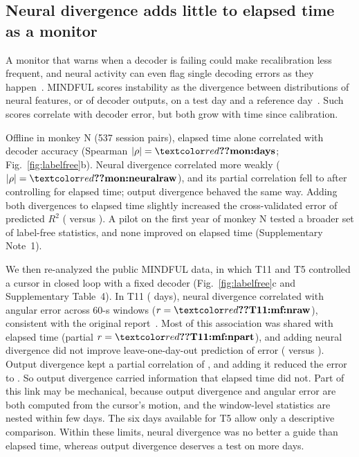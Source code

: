 \documentclass{iopjournal}
\begin{document}
\subsection{Neural divergence adds little to elapsed time as a monitor}

A monitor that warns when a decoder is failing could make recalibration less frequent, and neural activity can even
flag single decoding errors as they happen~\cite{evenchen2017}. MINDFUL scores instability as
the divergence between distributions of neural features, or of decoder outputs, on a test day and a reference
day~\cite{pun2024}. Such scores correlate with decoder error, but both grow with time since calibration.

Offline in monkey N (537 session pairs), elapsed time alone correlated with decoder accuracy (Spearman
$|\rho| = \val{mon:days}$; Fig.~\ref{fig:labelfree}b). Neural divergence correlated more weakly
($|\rho| = \val{mon:neuralraw}$), and its partial correlation fell to  after controlling for elapsed
time; output divergence behaved the same way. Adding both divergences to elapsed time slightly increased the
cross-validated error of predicted $R^2$ ( versus ). A pilot on the first year of monkey
N tested a broader set of label-free statistics, and none improved on elapsed time (Supplementary Note~1).

We then re-analyzed the public MINDFUL data, in which T11 and T5 controlled a cursor in closed loop with a fixed decoder
(Fig.~\ref{fig:labelfree}c and Supplementary Table~4). In T11 ( days), neural divergence correlated with
angular error across 60-s windows ($r = \val{T11:mf:nraw}$), consistent with the original report~\cite{pun2024}. Most of
this association was shared with elapsed time (partial $r = \val{T11:mf:npart}$), and adding neural divergence did not
improve leave-one-day-out prediction of error (\textdegree{} versus \textdegree{}).
Output divergence kept a partial correlation of , and adding it reduced the error to
\textdegree. So output divergence carried information that elapsed time did not. Part of this link
may be mechanical, because output divergence and angular error are both computed from the cursor's motion, and the
window-level statistics are nested within few days. The six days available for T5 allow only a descriptive comparison.
Within these limits, neural divergence was no better a guide than elapsed time, whereas output divergence deserves a
test on more days.
\end{document}
